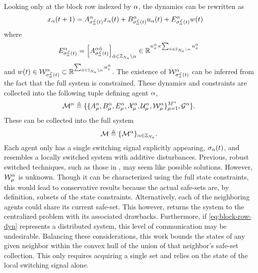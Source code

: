 Looking only at the block row indexed by $\alpha$, the dynamics can be rewritten as 
\begin{align}\label{eq:block-row-dyn}
x_\agentidx(t+1)&=A^{\agentidx}_{\ssl[\agentidx](t)}x_\agentidx(t)+B^\agentidx_{\ssl[\agentidx](t)}u_\agentidx(t)+E_{\ssl[\agentidx](t)}^\agentidx w(t)
\end{align}
where
\begin{align*}
E_{\ssl[\agentidx](t)}^\agentidx =\left[A^{\agentidx\tilde\agentidx}_{\ssl[\agentidx](t)}\right]_{\tilde\agentidx\in\idxset{\numagents}\setminus \agentidx}\in\real^{n_x^\agentidx \times \sum_{\tilde\agentidx\in\idxset{\numagents}\setminus \agentidx} n_x^{\tilde\agentidx}}
\end{align*}
and $w(t)\in\wcon[\ssl[\agentidx](t)]^\agentidx\subset \real^{ \sum_{\tilde\agentidx\in\idxset{\numagents}\setminus \agentidx} n_x^{\tilde\agentidx}}$.
 The existence of $\wcon[\ssl[\agentidx](t)]^\agentidx$ can be inferred from the fact that the full system is constrained. These dynamics and constraints are collected into the following tuple defining agent $\alpha$,
$$\agent{\agentidx}\triangleq\{\{A^{\agentidx}_{\modeidx},B^\agentidx_{\modeidx}, E_{\modeidx}^\agentidx,\xcon[\modeidx]^\agentidx,\ucon[\modeidx]^\agentidx, \wcon[\modeidx]^\agentidx\}_{\modeidx=1}^{\nummodes[\agentidx]},\graph^\agentidx\}.$$
These can be collected into the full system
\begin{equation}\label{eq:agent_notation}
\mathcal{M}\triangleq\{\mathcal{M}^{\alpha}\}_{\alpha\in\mathbb{Z}_{{N_a}}}.
\end{equation}
Each agent only has a single switching signal explicitly appearing, ${\sigma}_{\alpha}(t)$, and resembles a locally switched system with additive disturbances. Previous, robust switched techniques, such as those in \cite{Lavaei2021}, may seem like possible solutions. However, $\wcon[\modeidx]^\agentidx$ is unknown. Though it can be characterized using the full state constraints, this would lead to conservative results because the actual safe-sets are, by definition, subsets of the state constraints. Alternatively, each of the neighboring agents could share its current safe-set. This however, returns the system to the centralized problem with its associated drawbacks. Furthermore, if \autoref{eq:block-row-dyn} represents a distributed system, this level of communication may be undesirable. Balancing these considerations, this work bounds the states of any given neighbor within the convex hull of the union of that neighbor's safe-set collection. This only requires acquiring a single set and relies on the state of the local switching signal alone. 